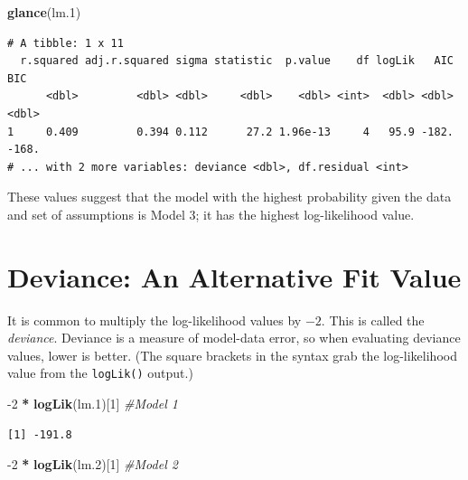 \documentclass[]{book}
\newenvironment{Shaded}{\begin{snugshade}}{\end{snugshade}}
\newcommand{\CommentTok}[1]{\textcolor[rgb]{0.56,0.35,0.01}{\textit{#1}}}
\newcommand{\DecValTok}[1]{\textcolor[rgb]{0.00,0.00,0.81}{#1}}
\newcommand{\FloatTok}[1]{\textcolor[rgb]{0.00,0.00,0.81}{#1}}
\newcommand{\KeywordTok}[1]{\textcolor[rgb]{0.13,0.29,0.53}{\textbf{#1}}}
\newcommand{\NormalTok}[1]{#1}
\newcommand{\OperatorTok}[1]{\textcolor[rgb]{0.81,0.36,0.00}{\textbf{#1}}}
\newcommand{\StringTok}[1]{\textcolor[rgb]{0.31,0.60,0.02}{#1}}
\begin{document}
\begin{Shaded}
\begin{Highlighting}[]
\KeywordTok{glance}\NormalTok{(lm}\FloatTok{.1}\NormalTok{)}
\end{Highlighting}
\end{Shaded}

\begin{verbatim}
# A tibble: 1 x 11
  r.squared adj.r.squared sigma statistic  p.value    df logLik   AIC   BIC
      <dbl>         <dbl> <dbl>     <dbl>    <dbl> <int>  <dbl> <dbl> <dbl>
1     0.409         0.394 0.112      27.2 1.96e-13     4   95.9 -182. -168.
# ... with 2 more variables: deviance <dbl>, df.residual <int>
\end{verbatim}

These values suggest that the model with the highest probability given the data and set of assumptions is Model 3; it has the highest log-likelihood value.

\hypertarget{deviance-an-alternative-fit-value}{%
\section{Deviance: An Alternative Fit Value}\label{deviance-an-alternative-fit-value}}

It is common to multiply the log-likelihood values by \(-2\). This is called the \emph{deviance}. Deviance is a measure of model-data error, so when evaluating deviance values, lower is better. (The square brackets in the syntax grab the log-likelihood value from the \texttt{logLik()} output.)

\begin{Shaded}
\begin{Highlighting}[]
\DecValTok{-2} \OperatorTok{*}\StringTok{ }\KeywordTok{logLik}\NormalTok{(lm}\FloatTok{.1}\NormalTok{)[}\DecValTok{1}\NormalTok{] }\CommentTok{#Model 1}
\end{Highlighting}
\end{Shaded}

\begin{verbatim}
[1] -191.8
\end{verbatim}

\begin{Shaded}
\begin{Highlighting}[]
\DecValTok{-2} \OperatorTok{*}\StringTok{ }\KeywordTok{logLik}\NormalTok{(lm}\FloatTok{.2}\NormalTok{)[}\DecValTok{1}\NormalTok{] }\CommentTok{#Model 2}
\end{Highlighting}
\end{Shaded}
\end{document}
